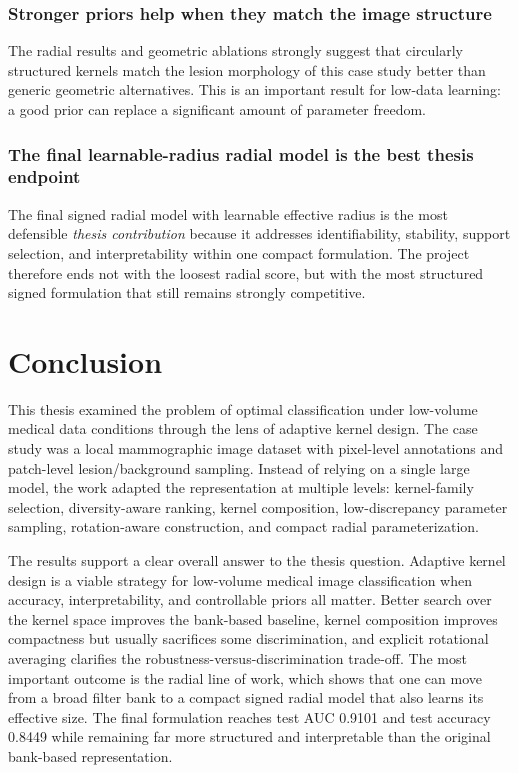 \documentclass{cernatsnote}
\let\oldsection\section
\let\oldsubsection\subsection
\let\oldsubsubsection\subsubsection
\let\chapter\oldsection
\let\section\oldsubsection
\let\subsection\oldsubsubsection
\begin{document}
\subsection{Stronger priors help when they match the image structure}
The radial results and geometric ablations strongly suggest that circularly structured kernels match the lesion morphology of this case study better than generic geometric alternatives. This is an important result for low-data learning: a good prior can replace a significant amount of parameter freedom.

\subsection{The final learnable-radius radial model is the best thesis endpoint}
The final signed radial model with learnable effective radius is the most defensible \emph{thesis contribution} because it addresses identifiability, stability, support selection, and interpretability within one compact formulation. The project therefore ends not with the loosest radial score, but with the most structured signed formulation that still remains strongly competitive.

\chapter{Conclusion}
This thesis examined the problem of optimal classification under low-volume medical data conditions through the lens of adaptive kernel design. The case study was a local mammographic image dataset with pixel-level annotations and patch-level lesion/background sampling. Instead of relying on a single large model, the work adapted the representation at multiple levels: kernel-family selection, diversity-aware ranking, kernel composition, low-discrepancy parameter sampling, rotation-aware construction, and compact radial parameterization.

The results support a clear overall answer to the thesis question. Adaptive kernel design is a viable strategy for low-volume medical image classification when accuracy, interpretability, and controllable priors all matter. Better search over the kernel space improves the bank-based baseline, kernel composition improves compactness but usually sacrifices some discrimination, and explicit rotational averaging clarifies the robustness-versus-discrimination trade-off. The most important outcome is the radial line of work, which shows that one can move from a broad filter bank to a compact signed radial model that also learns its effective size. The final formulation reaches test AUC 0.9101 and test accuracy 0.8449 while remaining far more structured and interpretable than the original bank-based representation.
\end{document}
